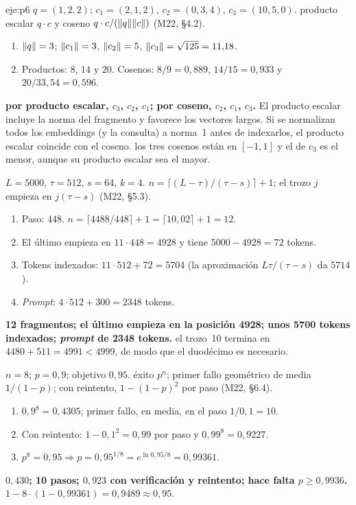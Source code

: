 \begin{solucion}{eje:p6}
\datos $q=(1,2,2)$; $c_1=(2,1,2)$, $c_2=(0,3,4)$, $c_3=(10,5,0)$.
\planteamiento producto escalar $q\cdot c$ y coseno $q\cdot c/(\lVert q\rVert\lVert c\rVert)$ (M22, §4.2).
\pasos
\begin{enumerate}[label=\arabic*.]
  \item $\lVert q\rVert=3$; $\lVert c_1\rVert=3$, $\lVert c_2\rVert=5$, $\lVert c_3\rVert=\sqrt{125}=11{,}18$.
  \item Productos: $8$, $14$ y $20$. Cosenos: $8/9=0{,}889$, $14/15=0{,}933$ y $20/33{,}54=0{,}596$.
\end{enumerate}
\resultado \textbf{por producto escalar, $c_3$, $c_2$, $c_1$; por coseno, $c_2$, $c_1$, $c_3$.} El producto escalar incluye la norma del fragmento y favorece los vectores largos. Si se normalizan todos los embeddings (y la consulta) a norma~1 antes de indexarlos, el producto escalar coincide con el coseno.
\comprobacion los tres cosenos están en $[-1,1]$ y el de $c_3$ es el menor, aunque su producto escalar sea el mayor.

\datos $L=5000$, $\tau=512$, $s=64$, $k=4$.
\planteamiento $n=\lceil(L-\tau)/(\tau-s)\rceil+1$; el trozo $j$ empieza en $j(\tau-s)$ (M22, §5.3).
\pasos
\begin{enumerate}[label=\arabic*.]
  \item Paso: $448$. $n=\lceil 4488/448\rceil+1=\lceil 10{,}02\rceil+1=12$.
  \item El último empieza en $11\cdot 448=4928$ y tiene $5000-4928=72$ tokens.
  \item Tokens indexados: $11\cdot 512+72=5704$ (la aproximación $L\tau/(\tau-s)$ da $5714$).
  \item \emph{Prompt}: $4\cdot 512+300=2348$ tokens.
\end{enumerate}
\resultado \textbf{12 fragmentos; el último empieza en la posición 4928; unos 5700 tokens indexados; \emph{prompt} de 2348 tokens.}
\comprobacion el trozo~10 termina en $4480+511=4991<4999$, de modo que el duodécimo es necesario.

\datos $n=8$; $p=0{,}9$; objetivo $0{,}95$.
\planteamiento éxito $p^{n}$; primer fallo geométrico de media $1/(1-p)$; con reintento, $1-(1-p)^{2}$ por paso (M22, §6.4).
\pasos
\begin{enumerate}[label=\arabic*.]
  \item $0{,}9^{8}=0{,}4305$; primer fallo, en media, en el paso $1/0{,}1=10$.
  \item Con reintento: $1-0{,}1^{2}=0{,}99$ por paso y $0{,}99^{8}=0{,}9227$.
  \item $p^{8}=0{,}95\Rightarrow p=0{,}95^{1/8}=e^{\ln 0{,}95/8}=0{,}99361$.
\end{enumerate}
\resultado \textbf{$0{,}430$; 10 pasos; $0{,}923$ con verificación y reintento; hace falta $p\ge 0{,}9936$.}
\comprobacion $1-8\cdot(1-0{,}99361)=0{,}9489\approx 0{,}95$.


\end{solucion}
